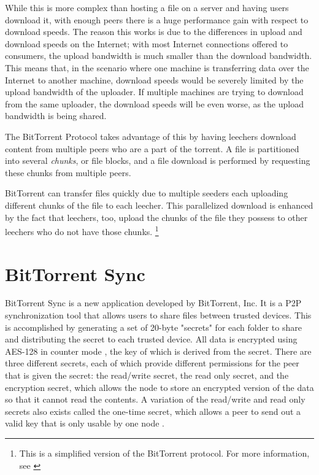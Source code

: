 \documentclass[12pt]{report}
\begin{document}
While this is more complex than hosting a file on a server and having users download it, with enough peers there is a huge performance gain with respect to download speeds. The reason this works is due to the differences in upload and download speeds on the Internet; with most Internet connections offered to consumers, the upload bandwidth is much smaller than the download bandwidth. This means that, in the scenario where one machine is transferring data over the Internet to another machine, download speeds would be severely limited by the upload bandwidth of the uploader. If multiple machines are trying to download from the same uploader, the download speeds will be even worse, as the upload bandwidth is being shared.

The BitTorrent Protocol takes advantage of this by having leechers download content from multiple peers who are a part of the torrent. A file is partitioned into several \textit{chunks}, or file blocks, and a file download is performed by requesting these chunks from multiple peers. %

BitTorrent can transfer files quickly due to multiple seeders each uploading different chunks of the file to each leecher. This parallelized download is enhanced by the fact that leechers, too, upload the chunks of the file they possess to other leechers who do not have those chunks. \footnote {This is a simplified version of the BitTorrent protocol. For more information, see \cite{bittorrentProtocol}}

\section{BitTorrent Sync}
BitTorrent Sync is a new application developed by BitTorrent, Inc. It is a P2P synchronization tool that allows users to share files between trusted devices. This is accomplished by generating a set of 20-byte "secrets" for each folder to share and distributing the secret to each trusted device. All data is encrypted using AES-128 in counter mode \cite{btsynctech}, the key of which is derived from the secret. There are three different secrets, each of which provide different permissions for the peer that is given the secret: the read/write secret, the read only secret, and the encryption secret, which allows the node to store an encrypted version of the data so that it cannot read the contents. A variation of the read/write and read only secrets also exists called the one-time secret, which allows a peer to send out a valid key that is only usable by one node \cite{btsyncuserguide}.
\end{document}
